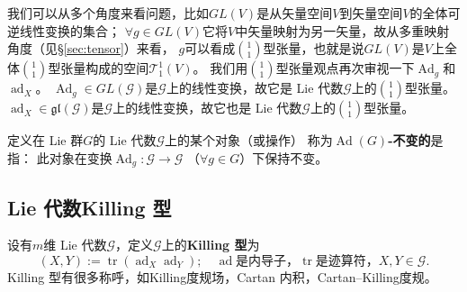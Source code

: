我们可以从多个角度来看问题，比如$GL(V)$是从矢量空间$V$到矢量空间$V$的全体可逆线性变换的集合；
$\forall g\in GL(V)$它将$V$中矢量映射为另一矢量，故从多重映射角度（见\S\ref{sec:tensor}）来看，
$g$可以看成$\binom{1}{1}$型张量，也就是说$GL(V)$是$V$上全体$\binom{1}{1}$型张量构成的空间$\mathcal{T}^1_1(V)$。
我们用$\binom{1}{1}$型张量观点再次审视一下$\operatorname{Ad}_g$和$\operatorname{ad}_X$。
$\operatorname{Ad}_g\in GL(\mathscr{G})$是$\mathscr{G}$上的线性变换，故它是 Lie 代数$\mathscr{G}$上的$\binom{1}{1}$型张量。
$\operatorname{ad}_X \in \mathfrak{gl}(\mathscr{G})$是$\mathscr{G}$上的线性变换，故它也是 Lie 代数$\mathscr{G}$上的$\binom{1}{1}$型张量。

\begin{definition}
    定义在 Lie 群$G$的 Lie 代数$\mathscr{G}$上的某个对象（或操作）
    称为\textbf{$\operatorname{Ad}(G)$-不变的}是指：
    此对象在变换$\operatorname{Ad}_g:\mathscr{G}\to \mathscr{G}$
    （$\forall g\in G$）下保持不变。
\end{definition}

\subsection{Lie 代数Killing 型}

\begin{definition}\label{chlg:def_Killing-Form}
    设有$m$维 Lie 代数$\mathscr{G}$，定义$\mathscr{G}$上的\textbf{Killing 型}为
    \begin{equation}
        (X,Y) := \operatorname{tr}(\operatorname{ad}_X  \operatorname{ad}_Y );\quad
        \operatorname{ad}\text{是内导子，} \operatorname{tr} \text{是迹算符，} X,Y\in \mathscr{G} .
    \end{equation}
    Killing 型有很多称呼，如Killing度规场，Cartan 内积，Cartan--Killing度规。
\end{definition}


